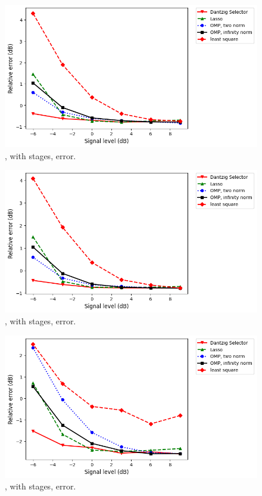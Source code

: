 \begin {figure} [H]
\includegraphics [width = \textwidth] {error-big-tall-two.png}
\caption {, with  stages, error.}
\end {figure}

\begin {figure} [H]
\includegraphics [width = \textwidth] {error-big-wide-two.png}
\caption {, with  stages, error.}
\end {figure}

\begin {figure} [H]
\includegraphics [width = \textwidth] {error-big-square-four.png}
\caption {, with  stages, error.}
\end {figure}

